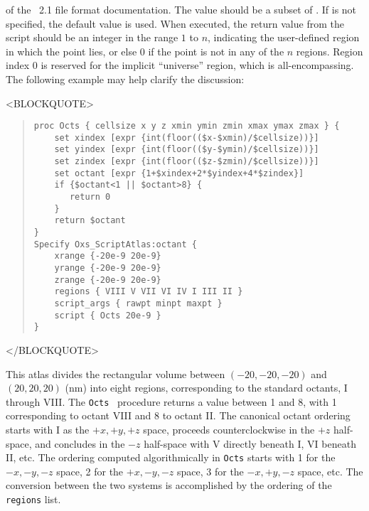 \begin{description}
 of the
\MIF~2.1 file format documentation.  The value 
should be a subset of .  If
 is not specified, the default value  is
used.  When executed, the return value from the script should be an
integer in the range $1$ to $n$, indicating the user-defined region in
which the point lies, or else $0$ if the point is not in any
of the $n$ regions.  Region index $0$ is reserved for the implicit
``universe'' region, which is all-encompassing.  The following example
may help clarify the discussion:
\begin{rawhtml}<BLOCKQUOTE>\end{rawhtml}
\begin{quote}
\begin{verbatim}
proc Octs { cellsize x y z xmin ymin zmin xmax ymax zmax } {
    set xindex [expr {int(floor(($x-$xmin)/$cellsize))}]
    set yindex [expr {int(floor(($y-$ymin)/$cellsize))}]
    set zindex [expr {int(floor(($z-$zmin)/$cellsize))}]
    set octant [expr {1+$xindex+2*$yindex+4*$zindex}]
    if {$octant<1 || $octant>8} {
       return 0
    }
    return $octant
}
Specify Oxs_ScriptAtlas:octant {
    xrange {-20e-9 20e-9}
    yrange {-20e-9 20e-9}
    zrange {-20e-9 20e-9}
    regions { VIII V VII VI IV I III II }
    script_args { rawpt minpt maxpt }
    script { Octs 20e-9 }
}\end{verbatim}
\end{quote}
\begin{rawhtml}</BLOCKQUOTE>\end{rawhtml}
This atlas divides the rectangular volume between $(-20,-20,-20)$ and
$(20,20,20)$ (nm) into eight regions, corresponding to the standard
octants, I through VIII.  The \texttt{Octs} \Tcl\ procedure returns a
value between 1 and 8, with 1 corresponding to octant VIII and 8 to
octant II.  The canonical octant ordering starts with I as the
$+x,+y,+z$ space, proceeds counterclockwise in the $+z$ half-space, and
concludes in the $-z$ half-space with V directly beneath I, VI beneath
II, etc.  The ordering computed algorithmically in \texttt{Octs}
starts with 1 for the $-x,-y,-z$ space, 2 for the $+x,-y,-z$ space, 3
for the $-x,+y,-z$ space, etc.  The conversion between the two systems
is accomplished by the ordering of the \texttt{regions} list.


\end{description}

